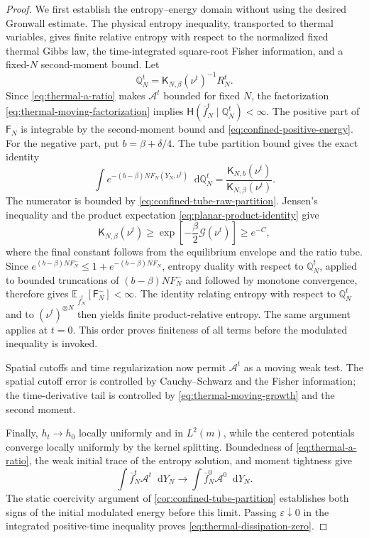 \documentclass[11pt,reqno]{amsart}
\numberwithin{equation}{section}
\theoremstyle{definition}
\theoremstyle{remark}
\newcommand{\E}{\mathbb E}
\newcommand{\Hr}{\mathsf H}
\newcommand{\Fr}{\mathsf F}
\newcommand{\K}{\mathsf K}
\newcommand{\Q}{\mathbb Q}
\newcommand{\dd}{\mathop{}\!\mathrm d}
\begin{document}
\begin{proof}
We first establish the entropy--energy domain without using the desired Gronwall estimate. The physical entropy inequality, transported to thermal variables, gives finite relative entropy with respect to the normalized fixed thermal Gibbs law, the time-integrated square-root Fisher information, and a fixed-$N$ second-moment bound. Let
\begin{equation}\label{eq:thermal-normalized-moving-law}
 \Q_N^t=\K_{N,\beta}(\nu^t)^{-1}R_N^t.
\end{equation}
Since \eqref{eq:thermal-a-ratio} makes $\mathcal A^t$ bounded for fixed $N$, the factorization \eqref{eq:thermal-moving-factorization} implies
$\Hr(\bar f_N^t\mid \Q_N^t)<\infty$. The positive part of $\Fr_N$ is integrable by the second-moment bound and \eqref{eq:confined-positive-energy}. For the negative part, put $b=\beta+\delta/4$. The tube partition bound gives the exact identity
\begin{equation}\label{eq:thermal-negative-moment}
 \int e^{-(b-\beta)NF_N(Y_N,\nu^t)}\dd \Q_N^t
 =\frac{\K_{N,b}(\nu^t)}{\K_{N,\beta}(\nu^t)}.
\end{equation}
The numerator is bounded by \eqref{eq:confined-tube-raw-partition}. Jensen's inequality and the product expectation \eqref{eq:planar-product-identity} give
\begin{equation}\label{eq:thermal-partition-lower}
 \K_{N,\beta}(\nu^t)
 \geq\exp\left[-\frac\beta2\mathcal G(\nu^t)\right]\geq e^{-C},
\end{equation}
where the final constant follows from the equilibrium envelope and the ratio tube. Since $e^{(b-\beta)NF_N^-}\leq1+e^{-(b-\beta)NF_N}$, entropy duality with respect to $\Q_N^t$, applied to bounded truncations of $(b-\beta)NF_N^-$ and followed by monotone convergence, therefore gives $\E_{\bar f_N^t}[\Fr_N^-]<\infty$. The identity relating entropy with respect to $\Q_N^t$ and to $(\nu^t)^{\otimes N}$ then yields finite product-relative entropy. The same argument applies at $t=0$. This order proves finiteness of all terms before the modulated inequality is invoked.

Spatial cutoffs and time regularization now permit $\mathcal A^t$ as a moving weak test. The spatial cutoff error is controlled by Cauchy--Schwarz and the Fisher information; the time-derivative tail is controlled by \eqref{eq:thermal-moving-growth} and the second moment.

Finally, $h_t\to h_0$ locally uniformly and in $L^2(m)$, while the centered potentials converge locally uniformly by the kernel splitting. Boundedness of \eqref{eq:thermal-a-ratio}, the weak initial trace of the entropy solution, and moment tightness give
\begin{equation}\label{eq:thermal-initial-pairing}
 \int\bar f_N^t\mathcal A^t\dd Y_N\longrightarrow
 \int\bar f_N^0\mathcal A^0\dd Y_N.
\end{equation}
The static coercivity argument of \cref{cor:confined-tube-partition} establishes both signs of the initial modulated energy before this limit. Passing $\varepsilon\downarrow0$ in the integrated positive-time inequality proves \eqref{eq:thermal-dissipation-zero}.
\end{proof}
\end{document}
